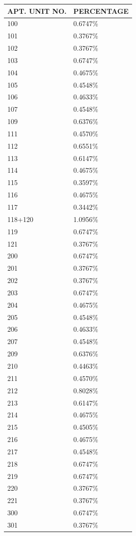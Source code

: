 \documentclass[
  14pt,
]{book}
\begin{document}
\begin{longtable}[]{@{}ll@{}}
\toprule
APT. UNIT NO. & PERCENTAGE \\
\midrule
\endhead
100 & 0.6747\% \\
101 & 0.3767\% \\
102 & 0.3767\% \\
103 & 0.6747\% \\
104 & 0.4675\% \\
105 & 0.4548\% \\
106 & 0.4633\% \\
107 & 0.4548\% \\
109 & 0.6376\% \\
111 & 0.4570\% \\
112 & 0.6551\% \\
113 & 0.6147\% \\
114 & 0.4675\% \\
115 & 0.3597\% \\
116 & 0.4675\% \\
117 & 0.3442\% \\
118+120 & 1.0956\% \\
119 & 0.6747\% \\
121 & 0.3767\% \\
200 & 0.6747\% \\
201 & 0.3767\% \\
202 & 0.3767\% \\
203 & 0.6747\% \\
204 & 0.4675\% \\
205 & 0.4548\% \\
206 & 0.4633\% \\
207 & 0.4548\% \\
209 & 0.6376\% \\
210 & 0.4463\% \\
211 & 0.4570\% \\
212 & 0.8028\% \\
213 & 0.6147\% \\
214 & 0.4675\% \\
215 & 0.4505\% \\
216 & 0.4675\% \\
217 & 0.4548\% \\
218 & 0.6747\% \\
219 & 0.6747\% \\
220 & 0.3767\% \\
221 & 0.3767\% \\
300 & 0.6747\% \\
301 & 0.3767\% \\

\end{longtable}
\end{document}
